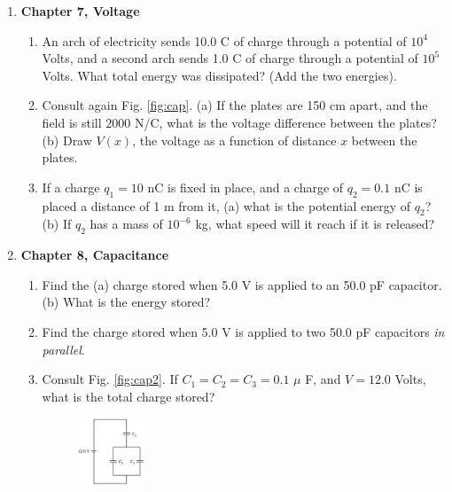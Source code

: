 \documentclass[10pt]{article}
\begin{document}
\begin{enumerate}
\begin{enumerate}
\end{enumerate}
\item \textbf{Chapter 7, Voltage}
\begin{enumerate}
\item An arch of electricity sends 10.0 C of charge through a potential of $10^4$ Volts, and a second arch sends 1.0 C of charge through a potential of $10^5$ Volts. What total energy was dissipated? (Add the two energies). \\ \vspace{2cm}
\item Consult again Fig. \ref{fig:cap}.  (a) If the plates are 150 cm apart, and the field is still $2000$ N/C, what is the voltage difference between the plates? (b) Draw $V(x)$, the voltage as a function of distance $x$ between the plates. \\ \vspace{2cm}
\item If a charge $q_1 = 10$ nC is fixed in place, and a charge of $q_2 = 0.1$ nC is placed a distance of 1 m from it, (a) what is the potential energy of $q_2$? (b) If $q_2$ has a mass of $10^{-6}$ kg, what speed will it reach if it is released? \\ \vspace{2cm}
\end{enumerate}
\item \textbf{Chapter 8, Capacitance}
\begin{enumerate}
\item Find the (a) charge stored when 5.0 V is applied to an 50.0 pF capacitor. (b) What is the energy stored? \\ \vspace{1cm}
\item Find the charge stored when 5.0 V is applied to two 50.0 pF capacitors \textit{in parallel}. \\ \vspace{1cm}
\item Consult Fig. \ref{fig:cap2}.  If $C_1 = C_2 = C_3 = 0.1$ $\mu$ F, and $V=12.0$ Volts, what is the total charge stored? \\ \vspace{1.5cm}
\begin{figure}
\centering
\includegraphics[width=0.2\textwidth]{figures/cap2.png}

\end{figure}
\end{enumerate}
\end{enumerate}
\end{document}

